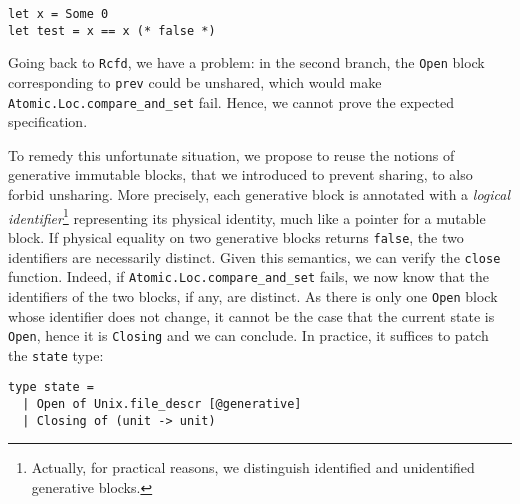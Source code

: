 \begin{verbatim}
let x = Some 0
let test = x == x (* false *)
\end{verbatim}

Going back to \texttt{Rcfd}, we have a problem: in the second branch, the \texttt{Open} block corresponding to \texttt{prev} could be unshared, which would make \texttt{Atomic.Loc.compare_and_set} fail.
Hence, we cannot prove the expected specification.

To remedy this unfortunate situation, we propose to reuse the notions of generative immutable blocks, that we introduced to prevent sharing, to also forbid unsharing.
More precisely, each generative block is annotated with a \emph{logical identifier}\footnote{Actually, for practical reasons, we distinguish identified and unidentified generative blocks.} representing its physical identity, much like a pointer for a mutable block.
If physical equality on two generative blocks returns \texttt{false}, the two identifiers are necessarily distinct.
Given this semantics, we can verify the \texttt{close} function.
Indeed, if \texttt{Atomic.Loc.compare_and_set} fails, we now know that the identifiers of the two blocks, if any, are distinct.
As there is only one \texttt{Open} block whose identifier does not change, it cannot be the case that the current state is \texttt{Open}, hence it is \texttt{Closing} and we can conclude.
In practice, it suffices to patch the \texttt{state} type:

\begin{verbatim}
type state =
  | Open of Unix.file_descr [@generative]
  | Closing of (unit -> unit)
\end{verbatim}

